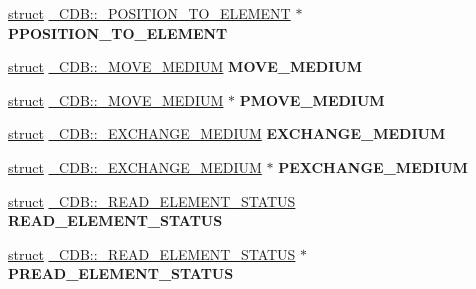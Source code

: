 \begin{DoxyCompactItemize}
\hyperlink{interfacestruct}{struct} \hyperlink{struct___c_d_b_1_1___p_o_s_i_t_i_o_n___t_o___e_l_e_m_e_n_t}{\+\_\+\+C\+D\+B\+::\+\_\+\+P\+O\+S\+I\+T\+I\+O\+N\+\_\+\+T\+O\+\_\+\+E\+L\+E\+M\+E\+NT} $\ast$ {\bfseries P\+P\+O\+S\+I\+T\+I\+O\+N\+\_\+\+T\+O\+\_\+\+E\+L\+E\+M\+E\+NT}
\item 
\mbox{\label{union___c_d_b_a702057c618bf0b6175154b3cf90ff0ad}} 
\hyperlink{interfacestruct}{struct} \hyperlink{struct___c_d_b_1_1___m_o_v_e___m_e_d_i_u_m}{\+\_\+\+C\+D\+B\+::\+\_\+\+M\+O\+V\+E\+\_\+\+M\+E\+D\+I\+UM} {\bfseries M\+O\+V\+E\+\_\+\+M\+E\+D\+I\+UM}
\item 
\mbox{\label{union___c_d_b_ac0b6b149d26b38409ae354511f005a6d}} 
\hyperlink{interfacestruct}{struct} \hyperlink{struct___c_d_b_1_1___m_o_v_e___m_e_d_i_u_m}{\+\_\+\+C\+D\+B\+::\+\_\+\+M\+O\+V\+E\+\_\+\+M\+E\+D\+I\+UM} $\ast$ {\bfseries P\+M\+O\+V\+E\+\_\+\+M\+E\+D\+I\+UM}
\item 
\mbox{\label{union___c_d_b_a78e65c2012fab27d9e51e930e8ffa03c}} 
\hyperlink{interfacestruct}{struct} \hyperlink{struct___c_d_b_1_1___e_x_c_h_a_n_g_e___m_e_d_i_u_m}{\+\_\+\+C\+D\+B\+::\+\_\+\+E\+X\+C\+H\+A\+N\+G\+E\+\_\+\+M\+E\+D\+I\+UM} {\bfseries E\+X\+C\+H\+A\+N\+G\+E\+\_\+\+M\+E\+D\+I\+UM}
\item 
\mbox{\label{union___c_d_b_ae5fbd48c0e51d17b7c02c46eb5d041aa}} 
\hyperlink{interfacestruct}{struct} \hyperlink{struct___c_d_b_1_1___e_x_c_h_a_n_g_e___m_e_d_i_u_m}{\+\_\+\+C\+D\+B\+::\+\_\+\+E\+X\+C\+H\+A\+N\+G\+E\+\_\+\+M\+E\+D\+I\+UM} $\ast$ {\bfseries P\+E\+X\+C\+H\+A\+N\+G\+E\+\_\+\+M\+E\+D\+I\+UM}
\item 
\mbox{\label{union___c_d_b_a752b284257823f067bd3a04739ce33e4}} 
\hyperlink{interfacestruct}{struct} \hyperlink{struct___c_d_b_1_1___r_e_a_d___e_l_e_m_e_n_t___s_t_a_t_u_s}{\+\_\+\+C\+D\+B\+::\+\_\+\+R\+E\+A\+D\+\_\+\+E\+L\+E\+M\+E\+N\+T\+\_\+\+S\+T\+A\+T\+US} {\bfseries R\+E\+A\+D\+\_\+\+E\+L\+E\+M\+E\+N\+T\+\_\+\+S\+T\+A\+T\+US}
\item 
\mbox{\label{union___c_d_b_a3042df64ac053e6f590677879348bc5a}} 
\hyperlink{interfacestruct}{struct} \hyperlink{struct___c_d_b_1_1___r_e_a_d___e_l_e_m_e_n_t___s_t_a_t_u_s}{\+\_\+\+C\+D\+B\+::\+\_\+\+R\+E\+A\+D\+\_\+\+E\+L\+E\+M\+E\+N\+T\+\_\+\+S\+T\+A\+T\+US} $\ast$ {\bfseries P\+R\+E\+A\+D\+\_\+\+E\+L\+E\+M\+E\+N\+T\+\_\+\+S\+T\+A\+T\+US}

\end{DoxyCompactItemize}
